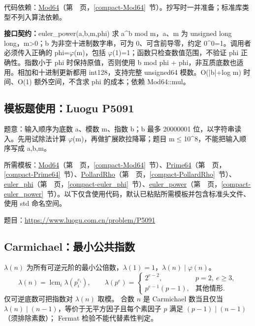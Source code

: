 代码依赖：\hyperref[compact-Mod64]{Mod64}（第~\pageref{compact-Mod64}~页，\ref{compact-Mod64}~节）。抄写时一并准备；标准库类型不列入算法依赖。

{\sloppy{}\noindent\textbf{接口契约：}euler\_power(a,b,m,phi) 求 a\textasciicircum{}b mod m，a、m 为 unsigned long long，m>0；b 为非空十进制数字串，可为 0、可含前导零，约定 0\textasciicircum{}0=1。调用者必须传入正确的 phi=$\varphi$(m)，包括 $\varphi$(1)=1；函数只检查数值范围，不验证 phi 正确性。指数小于 phi 时保持原值，否则使用 b mod phi + phi，非互质底数也适用。相加和十进制更新都用 int128，支持完整 unsigned64 模数。O(|b|+log m) 时间、O(1) 额外空间，不含求 phi 的成本；依赖 Mod64::mul。\par}



\Needspace{280pt}

\subsection*{模板题使用：Luogu P5091}

\label{usage-example-106}

题意：输入顺序为底数 a、模数 m、指数 b；b 最多 20000001 位，以字符串读入。先用试除法计算 $\varphi$(m)，再做扩展欧拉降幂；题目 m$\le$10\textasciicircum{}8，不能把输入顺序写成 a,b,m。

所需模板：\hyperref[compact-Mod64]{Mod64}（第~\pageref{compact-Mod64}~页，\ref{compact-Mod64}~节）、\hyperref[compact-Prime64]{Prime64}（第~\pageref{compact-Prime64}~页，\ref{compact-Prime64}~节）、\hyperref[compact-PollardRho]{PollardRho}（第~\pageref{compact-PollardRho}~页，\ref{compact-PollardRho}~节）、\hyperref[compact-euler_phi]{euler\_\allowbreak{}phi}（第~\pageref{compact-euler_phi}~页，\ref{compact-euler_phi}~节）、\hyperref[compact-euler_power]{euler\_\allowbreak{}power}（第~\pageref{compact-euler_power}~页，\ref{compact-euler_power}~节）。以下仅含使用代码，默认已粘贴所需模板并包含标准头文件、使用 std 命名空间。

题目：\url{https://www.luogu.com.cn/problem/P5091}



\subsection{Carmichael：最小公共指数}\label{knowledge-carmichael}
$\lambda(n)$ 为所有可逆元阶的最小公倍数，$\lambda(1)=1$，$\lambda(n)\mid\varphi(n)$。
\[
\lambda(n)=\operatorname{lcm}_i\lambda(p_i^{e_i}),\qquad
\lambda(p^e)=
\begin{cases}
2^{e-2},&p=2,\ e\ge3,\\
p^{e-1}(p-1),&\text{其他情形}.
\end{cases}
\]
仅可逆底数可把指数对 $\lambda(n)$ 取模。
合数 $n$ 是 Carmichael 数当且仅当 $\lambda(n)\mid(n-1)$，等价于无平方因子且每个素因子 $p$ 满足 $(p-1)\mid(n-1)$（须排除素数）；
Fermat 检验不能代替素性判定。



